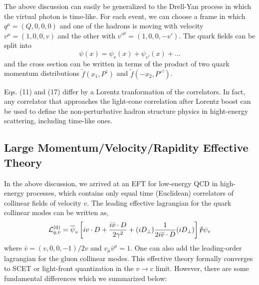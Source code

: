 \documentclass[prd,aps,twocolumn,preprintnumbers,showpacs,nofootinbib,superscriptaddress,notitlepage]{revtex4-1}
\begin{document}
The above discussion can easily be generalized to the Drell-Yan process in which
the virtual photon is time-like. For each event, we can choose a frame in which $q^\mu=(Q,0,0,0)$ and  
one of the hadrons is moving with velocity $v^\mu=(1,0,0,v)$ and the other with
$v'^{\mu}=(1,0,0,-v')$. The quark fields can be split into
\begin{equation}
  \psi (x) = \psi_v(x) + \psi_{v'}(x) + ...
\end{equation}
and the cross section can be written in terms of the product of two quark momentum distributions $\tilde f(x_1, P^z)$ and $\tilde f(-x_2, P'^z)$. 

Eqs. (11) and (17) differ by a Lorentz tranformation of the correlators. 
In fact, any correlator that approaches the light-cone correlation after Lorentz
boost can be used to define the non-perturbative hadron structure physics in hight-energy scattering, including time-like ones. 

\subsection{Large Momentum/Velocity/Rapidity Effective Theory}

In the above discussion, we arrived at an EFT for low-energy QCD in high-energy processes, which contains only equal time (Euclidean) correlators of collinear fields of velocity $v$. The leading effective lagrangian for the quark collinear modes can be written as, 
\begin{equation}
  {\cal L}_{q,v}^{(0)} = \overline{\psi}_v \left[iv\cdot D + 
   \frac{i {\bar v}\cdot D}{2\gamma^2}
   + (iD_\perp)\frac{1}{2i\bar v \cdot D}(iD_\perp)\right] \slashed{\bar v}\psi_v
\end{equation}
where ${\bar v} = (v,0,0,-1)/2v$ and $v_\mu {\bar v}^\mu=1$. 
One can also add the leading-order lagrangian for the gluon collinear modes. This effective theory formally converges to SCET or light-front quantization in the $v\to c$ limit. However, there are some fundamental differences which we summarized below: 
\end{document}
